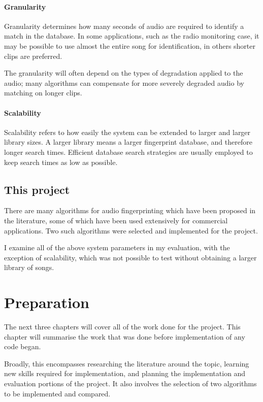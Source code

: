 \documentclass[12pt,a4paper,twoside,openright]{report}
\begin{document}
\subsubsection{Granularity}

Granularity determines how many seconds of audio are required to identify a match in the database. In some applications, such as the radio monitoring case, it may be possible to use almost the entire song for identification, in others shorter clips are preferred.

The granularity will often depend on the types of degradation applied to the audio; many algorithms can compensate for more severely degraded audio by matching on longer clips.

\subsubsection{Scalability}

Scalability refers to how easily the system can be extended to larger and larger library sizes. A larger library means a larger fingerprint database, and therefore longer search times. Efficient database search strategies are usually employed to keep search times as low as possible.


\section{This project}

There are many algorithms for audio fingerprinting which have been proposed in the literature, some of which have been used extensively for commercial applications. Two such algorithms were selected and implemented for the project.

I examine all of the above system parameters in my evaluation, with the exception of scalability, which was not possible to test without obtaining a larger library of songs.


\chapter{Preparation}
\label{preparation}

The next three chapters will cover all of the work done for the project. This chapter will summarise the work that was done before implementation of any code began. 

Broadly, this encompasses researching the literature around the topic, learning new skills required for implementation, and planning the implementation and evaluation portions of the project. It also involves the selection of two algorithms to be implemented and compared.
\end{document}
